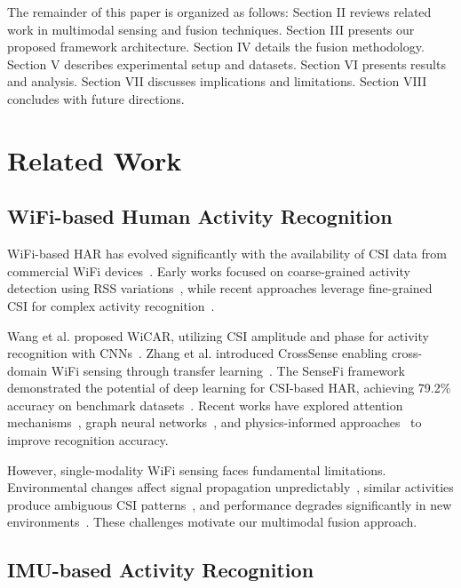 \documentclass[journal]{IEEEtran}
\begin{document}
The remainder of this paper is organized as follows: Section II reviews related work in multimodal sensing and fusion techniques. Section III presents our proposed framework architecture. Section IV details the fusion methodology. Section V describes experimental setup and datasets. Section VI presents results and analysis. Section VII discusses implications and limitations. Section VIII concludes with future directions.

\section{Related Work}

\subsection{WiFi-based Human Activity Recognition}

WiFi-based HAR has evolved significantly with the availability of CSI data from commercial WiFi devices~\cite{csi2015survey}. Early works focused on coarse-grained activity detection using RSS variations~\cite{rss2013activity}, while recent approaches leverage fine-grained CSI for complex activity recognition~\cite{widar2019, crosssense2018}.

Wang et al. proposed WiCAR, utilizing CSI amplitude and phase for activity recognition with CNNs~\cite{wicar2018}. Zhang et al. introduced CrossSense enabling cross-domain WiFi sensing through transfer learning~\cite{crosssense2018}. The SenseFi framework demonstrated the potential of deep learning for CSI-based HAR, achieving 79.2\% accuracy on benchmark datasets~\cite{sensefi2023}. Recent works have explored attention mechanisms~\cite{attention2023wifi}, graph neural networks~\cite{gnn2024csi}, and physics-informed approaches~\cite{pinn2024wifi} to improve recognition accuracy.

However, single-modality WiFi sensing faces fundamental limitations. Environmental changes affect signal propagation unpredictably~\cite{environment2023}, similar activities produce ambiguous CSI patterns~\cite{ambiguity2022}, and performance degrades significantly in new environments~\cite{domain2023adaptation}. These challenges motivate our multimodal fusion approach.

\subsection{IMU-based Activity Recognition}
\end{document}
